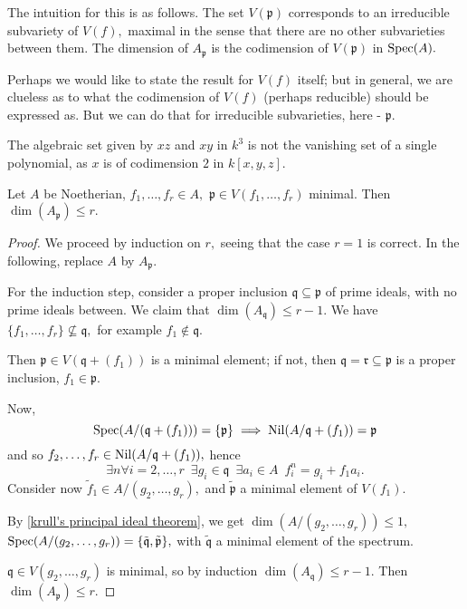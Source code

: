 \begin{note}
  The intuition for this is as follows. The set \(V(\mathfrak{p})\) corresponds to an irreducible subvariety of \(V(f),\) maximal in the sense that there are no other subvarieties between them. The dimension of \(A_{\mathfrak{p}}\) is the codimension of \(V(\mathfrak{p})\) in \(\text{Spec}(A).\)

  Perhaps we would like to state the result for \(V(f)\) itself; but in general, we are clueless as to what the codimension of \(V(f)\) (perhaps reducible) should be expressed as. But we can do that for irreducible subvarieties, here - \(\mathfrak{p}.\)
\end{note}

\begin{example}
  The algebraic set given by \(xz\) and \(xy\) in \(k^3\) is not the vanishing set of a single polynomial, as \(x\) is of codimension \(2\) in \(k[x, y, z].\)
\end{example}

\begin{corollary}
  \label{krull corollary}
  Let \(A\) be Noetherian,
  \(f_1, \dotsc, f_r \in A,\)
  \(\mathfrak p \in V(f_1, \dotsc, f_r)\) minimal.
  Then
  \(\dim(A_{\mathfrak p}) \leq r.\)
\end{corollary}
\begin{proof}
  We proceed by induction on \(r,\) seeing that the case \(r=1\) is correct. In the following, replace \(A\) by \(A_{\mathfrak p}.\)

  For the induction step, consider a proper inclusion \(\mathfrak q \subseteq \mathfrak p\) of prime ideals, with no prime ideals between. We claim that \(\dim(A_{\mathfrak q}) \leq r-1.\)
  We have
  \(\{f_1, \dotsc, f_r\} \not\subseteq \mathfrak q,\)
  for example \(f_1 \notin \mathfrak q.\)

  Then \(\mathfrak p \in V(\mathfrak q + (f_1))\) is a  minimal element; if not, then \(\mathfrak q = \mathfrak r \subseteq \mathfrak p\) is a proper inclusion, \(f_1 \in \mathfrak p.\)

  Now,
  \[\text{Spec}(A/{(\mathfrak q + (f_1))}) = \{\mathfrak p\} \implies \operatorname{Nil}(A / {\mathfrak q + (f_1)}) = \mathfrak p\]
  and so \(f_2, \dotsc, f_r \in \operatorname{Nil}(A/{\mathfrak q + (f_1)}),\) hence
  \[\exists n \forall i = 2, \dotsc, r \enspace \exists g_i \in \mathfrak q \enspace \exists a_i \in A \enspace f_i^n = g_i + f_1 a_i.\]
  Consider now \(\tilde{f}_1 \in A/{(g_2, \dotsc, g_r)},\) and \(\tilde{\mathfrak p}\) a minimal element of \(V(f_1).\)

  By \cref{krull's principal ideal theorem}, we get
  \(\dim(A/{(g_2, \dotsc, g_r)}) \leq 1,\)
  \(\text{Spec}(A/{(g_2, \dotsc, g_r)}) = \{\tilde{\mathfrak q}, \tilde{\mathfrak p}\},\)
  with \(\tilde{\mathfrak q}\) a minimal element of the spectrum.

  \(\mathfrak q \in V(g_2, \dotsc, g_r)\) is minimal, so by induction \(\dim(A_{\mathfrak q}) \leq r - 1.\) Then \(\dim(A_{\mathfrak p}) \leq r.\)
\end{proof}

